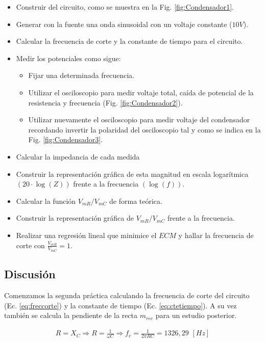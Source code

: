 \documentclass[11pt]{report}
\begin{document}
\begin{refsection}
\begin{itemize}
    \item Construir del circuito, como se muestra en la Fig. \ref{fig:Condensador1}.
    \item Generar con la fuente una onda sinusoidal con un voltaje constante ($10V$).
    \item Calcular la frecuencia de corte y la constante de tiempo para el circuito.
    \item Medir los potenciales como sigue:
    \begin{itemize}
        \item Fijar una determinada frecuencia.
        \item Utilizar el osciloscopio para medir voltaje total, caída de potencial de la resistencia y 
        frecuencia (Fig. \ref{fig:Condensador2}).
        \item Utilizar nuevamente el osciloscopio para medir voltaje del condensador recordando invertir 
        la polaridad del osciloscopio tal y como se indica en la Fig. \ref{fig:Condensador3}.
    \end{itemize}
    \item Calcular la impedancia de cada medida
    \item Construir la representación gráfica de esta magnitud en escala logarítmica $(20 \cdot \log(Z))$ 
    frente a la frecuencia $(\log(f))$.
    \item Calcular la función ${V_{mR}}/{V_{mC}}$ de forma teórica.
    \item Construir la representación gráfica de ${V_{mR}}/{V_{mC}}$ frente a la frecuencia.
    \item Realizar una regresión lineal que minimice el $ECM$ y hallar la frecuencia de corte con $\frac{V_{mR}}{V_{mC}} = 1$.
\end{itemize}

\subsection{Discusión}
Comenzamos la segunda práctica calculando la frecuencia de corte del circuito (Ec. \ref{eq:freccorte}) 
y la constante de tiempo (Ec. \ref{eq:ctetiempo}). A su vez también se calcula la pendiente de la recta $m_{rec}$ para un estudio posterior.

\begin{center}
\begin{equation}
\begin{split}
    R=X_C \Rightarrow R=\frac{1}{\omega C} \Rightarrow f_c=\frac{1}{2\pi R C} = 1326,29 \hspace{4pt}[Hz]
    \label{eq:freccorte}
\end{split}
\end{equation}


\end{center}
\end{refsection}
\end{document}
